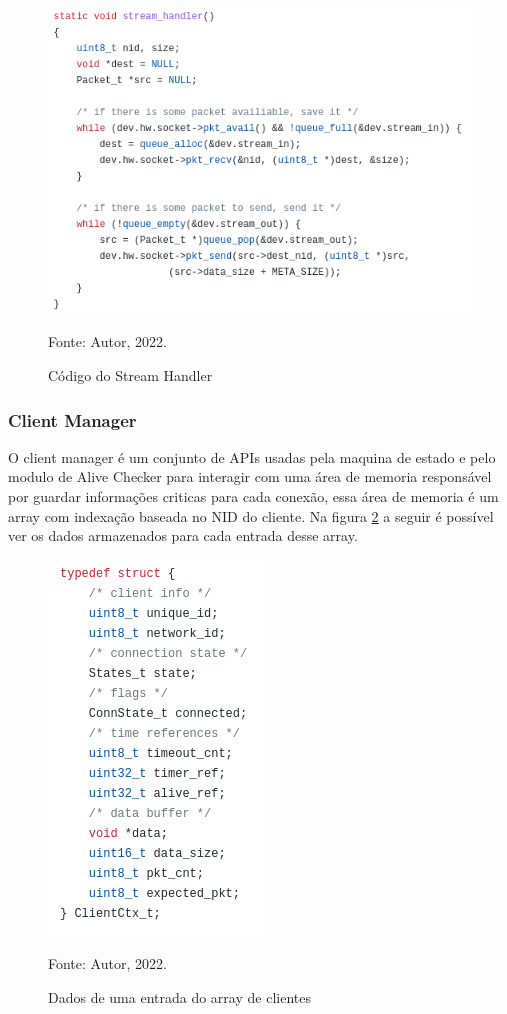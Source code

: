 \begin{figure}[H]
    \centering
	\caption{Código do Stream Handler}
    \includegraphics[height=0.3\textheight,keepaspectratio]{img/stream-handler.png}
    \label{fig:code-sh}
    
    Fonte: Autor, 2022.
\end{figure}

\subsubsection{Client Manager}

O client manager é um conjunto de APIs usadas pela maquina de estado e pelo modulo de Alive Checker
para interagir com uma área de memoria responsável por guardar informações criticas para cada conexão,
essa área de memoria é um array com indexação baseada no NID do cliente. Na figura \ref{fig:code-clt-ctx} a seguir é possível ver os dados armazenados para cada entrada desse array.

\begin{figure}[H]
    \centering
	\caption{Dados de uma entrada do array de clientes}
    \includegraphics[height=0.3\textheight,keepaspectratio]{img/clt-ctx.png}
    \label{fig:code-clt-ctx}
    
    Fonte: Autor, 2022.
\end{figure}


